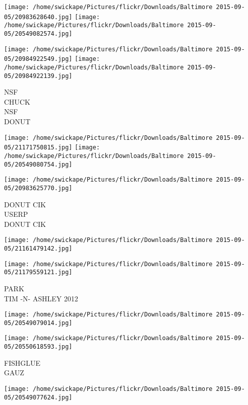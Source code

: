 \documentclass[10pt,letterpaper]{article}
\begin{document}
\texttt{[image: /home/swickape/Pictures/flickr/Downloads/Baltimore 2015-09-05/20983628640.jpg]}
\texttt{[image: /home/swickape/Pictures/flickr/Downloads/Baltimore 2015-09-05/20549082574.jpg]}

\texttt{[image: /home/swickape/Pictures/flickr/Downloads/Baltimore 2015-09-05/20984922549.jpg]}
\texttt{[image: /home/swickape/Pictures/flickr/Downloads/Baltimore 2015-09-05/20984922139.jpg]}

NSF\\
CHUCK\\
NSF\\
DONUT\\
\pagebreak

\texttt{[image: /home/swickape/Pictures/flickr/Downloads/Baltimore 2015-09-05/21171750815.jpg]}
\texttt{[image: /home/swickape/Pictures/flickr/Downloads/Baltimore 2015-09-05/20549080754.jpg]}

\vspace{0.25in}
\texttt{[image: /home/swickape/Pictures/flickr/Downloads/Baltimore 2015-09-05/20983625770.jpg]}

DONUT CIK\\
USERP\\
DONUT CIK\\
\pagebreak

\texttt{[image: /home/swickape/Pictures/flickr/Downloads/Baltimore 2015-09-05/21161479142.jpg]}

\vspace{0.25in}
\texttt{[image: /home/swickape/Pictures/flickr/Downloads/Baltimore 2015-09-05/21179559121.jpg]}

PARK\\
TIM {-}N{-} ASHLEY 2012\\
\pagebreak

\texttt{[image: /home/swickape/Pictures/flickr/Downloads/Baltimore 2015-09-05/20549079014.jpg]}

\vspace{0.25in}
\texttt{[image: /home/swickape/Pictures/flickr/Downloads/Baltimore 2015-09-05/20550618593.jpg]}

FISHGLUE\\
GAUZ\\
\pagebreak

\texttt{[image: /home/swickape/Pictures/flickr/Downloads/Baltimore 2015-09-05/20549077624.jpg]}
\end{document}

